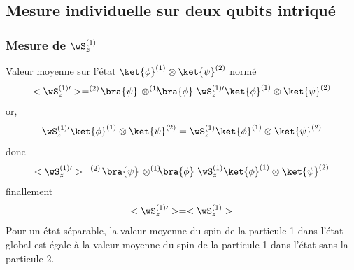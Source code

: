\subsection{Mesure individuelle sur deux qubits intriqué} %
\subsubsection{Mesure de $\wS_z^{(1)}$} %
Valeur moyenne sur l'état $\ket{\phi}^{(1)}\otimes\ket{\psi}^{(2)}$ normé
\[
<\wS_z^{(1)\prime}>=^{(2)}\!\bra{\psi}\,\otimes^{(1)}\!\!\!\bra{\phi}
\ \wS_z^{(1)\prime}\ket{\phi}^{(1)}\otimes\ket{\psi}^{(2)}
\]
or,
\[
\wS_z^{(1)\prime}\ket{\phi}^{(1)}\otimes\ket{\psi}^{(2)}
=\wS_z^{(1)}\ket{\phi}^{(1)}\otimes\ket{\psi}^{(2)}
\]
donc
\[
<\wS_z^{(1)\prime}>=^{(2)}\!\bra{\psi}\,\otimes^{(1)}\!\!\!\bra{\phi}
\ \wS_z^{(1)}\ket{\phi}^{(1)}\otimes\ket{\psi}^{(2)}
\]
finallement
\[
<\wS_z^{(1)\prime}>=<\wS_z^{(1)}>
\]
Pour un état séparable, la valeur moyenne du spin de la particule 1 dans l'état
global est égale à la valeur moyenne du spin de la particule 1 dans l'état sans
la particule 2.

